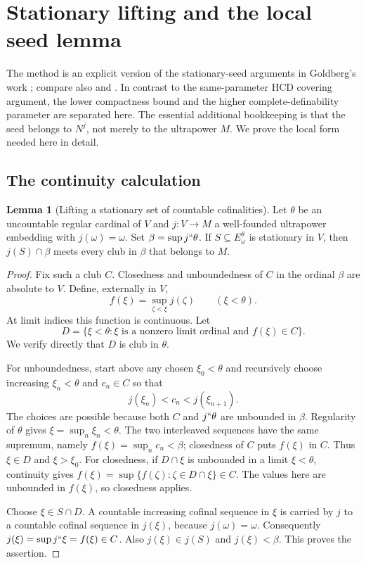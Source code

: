 \documentclass[11pt,letterpaper]{article}
\theoremstyle{definition}
\newtheorem{lemma}[definition]{Lemma}
\numberwithin{equation}{section}
\newcommand{\HCD}{\mathrm{HCD}}
\begin{document}
\section{Stationary lifting and the local seed lemma}\label{sec:seed}

The method is an explicit version of the stationary-seed arguments in
Goldberg's work \cite[Proposition~2.3 and Lemma~2.7]{dichotomy}; compare
also \cite[Theorem~4.13]{unique} and \cite[Proposition~2.2]{note}.
In contrast to the same-parameter $\HCD$ covering argument, the lower
compactness bound and the higher complete-definability parameter are
separated here. The essential additional bookkeeping is
that the seed belongs to $N^j$, not merely to the ultrapower $M$.
We prove the local form needed here in detail.

\subsection{The continuity calculation}

\begin{lemma}[Lifting a stationary set of countable cofinalities]\label{lem:lift}
Let $\theta$ be an uncountable regular cardinal of $V$ and
$j:V\to M$ a well-founded ultrapower embedding with $j(\omega)=\omega$.
Set $\beta=\sup j``\theta$. If $S\subseteq E^\theta_\omega$ is
stationary in $V$, then $j(S)\cap\beta$ meets every club in $\beta$
that belongs to $M$.
\end{lemma}
\begin{proof}
Fix such a club $C$. Closedness and unboundedness of $C$ in the ordinal
$\beta$ are absolute to $V$. Define, externally in $V$,
\[
f(\xi)=\sup_{\zeta<\xi}j(\zeta)\qquad(\xi<\theta).
\]
At limit indices this function is continuous. Let
\[
D=\{\xi<\theta:\xi\text{ is a nonzero limit ordinal and }f(\xi)\in C\}.
\]
We verify directly that $D$ is club in $\theta$.

For unboundedness, start above any chosen $\xi_0<\theta$ and recursively
choose increasing $\xi_n<\theta$ and $c_n\in C$ so that
\[
j(\xi_n)<c_n<j(\xi_{n+1}).
\]
The choices are possible because both $C$ and $j``\theta$ are
unbounded in $\beta$. Regularity of $\theta$ gives
$\xi=\sup_n\xi_n<\theta$. The two interleaved sequences have the same
supremum, namely $f(\xi)=\sup_n c_n<\beta$; closedness of $C$ puts
$f(\xi)$ in $C$. Thus $\xi\in D$ and $\xi>\xi_0$.
For closedness, if $D\cap\xi$ is unbounded in a limit
$\xi<\theta$, continuity gives
$f(\xi)=\sup\{f(\zeta):\zeta\in D\cap\xi\}\in C$.
The values here are unbounded in $f(\xi)$, so closedness applies.

Choose $\xi\in S\cap D$. A countable increasing cofinal sequence in
$\xi$ is carried by $j$ to a countable cofinal sequence in $j(\xi)$,
because $j(\omega)=\omega$. Consequently
$j(\xi)=\sup j``\xi=f(\xi)\in C$. Also
$j(\xi)\in j(S)$ and $j(\xi)<\beta$. This proves the assertion.
\end{proof}
\end{document}
